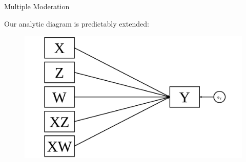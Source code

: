 \documentclass{beamer}
\begin{document}
\begin{frame}{Multiple Moderation}
  
  Our analytic diagram is predictably extended:

  \begin{figure}
    \includegraphics[width=\textwidth]{figures/twoModAnalytic.pdf}
  \end{figure}

\end{frame}

  
\end{document}
